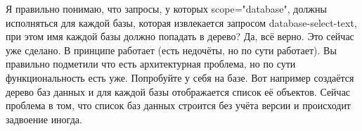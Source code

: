 \documentclass[10pt,a4paper]{article}
\begin{document}
Я правильно понимаю, что запросы, у которых scope="database", должны исполняться для каждой базы, которая извлекается запросом database-select-text, при этом имя каждой базы должно попадать в дерево?
Да, всё верно. Это сейчас уже сделано. В принципе работает (есть недочёты, но по сути работает). Вы правильно подметили что есть архитектурная проблема, но по сути функциональность есть уже. Попробуйте у себя на базе. Вот например создаётся дерево баз данных и для каждой базы отображается список её объектов. Сейчас проблема в том, что список баз данных строится без учёта версии и происходит задвоение иногда.
\end{document}

